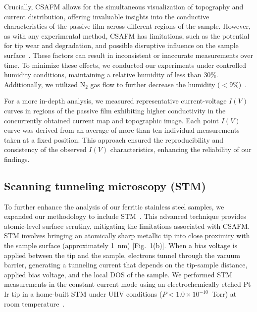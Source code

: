\documentclass[jkps,reprint,twocolumn,showkeys]{revtex4}
\begin{document}
Crucially, CSAFM allows for the simultaneous visualization of topography and current distribution, offering invaluable insights into the conductive characteristics of the passive film across different regions of the sample. 
However, as with any experimental method, CSAFM has limitations, such as the potential for tip wear and degradation, and possible disruptive influence on the sample surface~\cite{ji1998EffectsRelativeHumidity, stukalov2006RelativeHumidityControl, zitzler2002CapillaryForcesTapping, Ji2015, Jiang2019, Guo2006, jacobs2017MeasuringUnderstandingContact, sumaiya2020ImprovingReliabilityConductive}.
These factors can result in inconsistent or inaccurate measurements over time. 
To minimize these effects, we conducted our experiments under controlled humidity conditions, maintaining a relative humidity of less than 30\%. 
Additionally, we utilized N$_2$ gas flow to further decrease the humidity ($<9$\%)~\cite{Ji2015}.

For a more in-depth analysis, we measured representative current-voltage $I(V)$ curves in regions of the passive film exhibiting higher conductivity in the concurrently obtained current map and topographic image. 
Each point $I(V)$ curve was derived from an average of more than ten individual measurements taken at a fixed position. 
This approach ensured the reproducibility and consistency of the observed $I(V)$ characteristics, enhancing the reliability of our findings.

\subsection{Scanning tunneling microscopy (STM)}
To further enhance the analysis of our ferritic stainless steel samples, we expanded our methodology to include STM~\cite{hansma1987ScanningTunnelingMicroscopy}. 
This advanced technique provides atomic-level surface scrutiny,  mitigating the limitations associated with CSAFM. 
STM involves bringing an atomically sharp metallic tip into close proximity  with the sample surface (approximately 1~nm) [Fig.~1(b)].
When a bias voltage is applied between the tip and the sample, electrons tunnel through the vacuum barrier, generating a tunneling current that depends on the tip-sample distance, applied bias voltage, and the local DOS of the sample. 
We performed STM measurements in the constant current mode using an electrochemically etched Pt-Ir tip in a home-built STM under UHV conditions ($P<1.0\times10^{-10}$~Torr) at room temperature~\cite{cho2020SpecificStackingAngles}.
\end{document}
